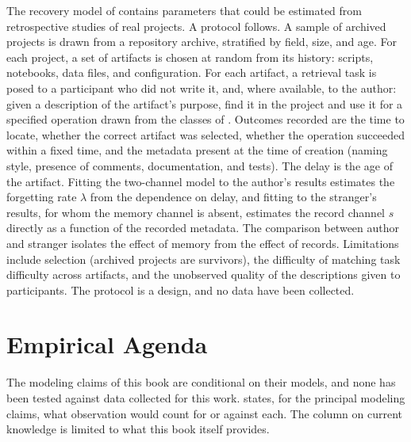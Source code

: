 \documentclass[11pt,twoside,openright]{book}
\theoremstyle{plain}
\theoremstyle{definition}
\theoremstyle{remark}
\begin{document}
The recovery model of  contains parameters that could be estimated from retrospective studies of real projects. A protocol follows. A sample of archived projects is drawn from a repository archive, stratified by field, size, and age. For each project, a set of artifacts is chosen at random from its history: scripts, notebooks, data files, and configuration. For each artifact, a retrieval task is posed to a participant who did not write it, and, where available, to the author: given a description of the artifact's purpose, find it in the project and use it for a specified operation drawn from the classes of . Outcomes recorded are the time to locate, whether the correct artifact was selected, whether the operation succeeded within a fixed time, and the metadata present at the time of creation (naming style, presence of comments, documentation, and tests). The delay is the age of the artifact. Fitting the two-channel model to the author's results estimates the forgetting rate $\lambda$ from the dependence on delay, and fitting to the stranger's results, for whom the memory channel is absent, estimates the record channel $s$ directly as a function of the recorded metadata. The comparison between author and stranger isolates the effect of memory from the effect of records. Limitations include selection (archived projects are survivors), the difficulty of matching task difficulty across artifacts, and the unobserved quality of the descriptions given to participants. The protocol is a design, and no data have been collected.

\chapter{Empirical Agenda}\label{app:agenda}

The modeling claims of this book are conditional on their models, and none has been tested against data collected for this work.  states, for the principal modeling claims, what observation would count for or against each. The column on current knowledge is limited to what this book itself provides.
\end{document}

